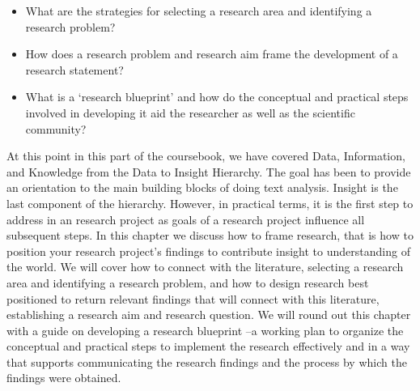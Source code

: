 \documentclass[
  letterpaper,
]{scrbook}
\providecommand{\tightlist}{%
  \setlength{\itemsep}{0pt}\setlength{\parskip}{0pt}}\usepackage{longtable,booktabs,array}
\begin{document}
\begin{tcolorbox}[enhanced jigsaw, title=\textcolor{quarto-callout-note-color}{\faInfo}\hspace{0.5em}{Keys}, breakable, colback=white, colframe=quarto-callout-note-color-frame, bottomrule=.15mm, left=2mm, bottomtitle=1mm, colbacktitle=quarto-callout-note-color!10!white, opacityback=0, arc=.35mm, toprule=.15mm, coltitle=black, leftrule=.75mm, opacitybacktitle=0.6, toptitle=1mm, titlerule=0mm, rightrule=.15mm]

\begin{itemize}
\tightlist
\item
  What are the strategies for selecting a research area and identifying
  a research problem?
\item
  How does a research problem and research aim frame the development of
  a research statement?
\item
  What is a `research blueprint' and how do the conceptual and practical
  steps involved in developing it aid the researcher as well as the
  scientific community?
\end{itemize}

\end{tcolorbox}

At this point in this part of the coursebook, we have covered Data,
Information, and Knowledge from the Data to Insight Hierarchy. The goal
has been to provide an orientation to the main building blocks of doing
text analysis. Insight is the last component of the hierarchy. However,
in practical terms, it is the first step to address in an research
project as goals of a research project influence all subsequent steps.
In this chapter we discuss how to frame research, that is how to
position your research project's findings to contribute insight to
understanding of the world. We will cover how to connect with the
literature, selecting a research area and identifying a research
problem, and how to design research best positioned to return relevant
findings that will connect with this literature, establishing a research
aim and research question. We will round out this chapter with a guide
on developing a research blueprint --a working plan to organize the
conceptual and practical steps to implement the research effectively and
in a way that supports communicating the research findings and the
process by which the findings were obtained.
\end{document}
